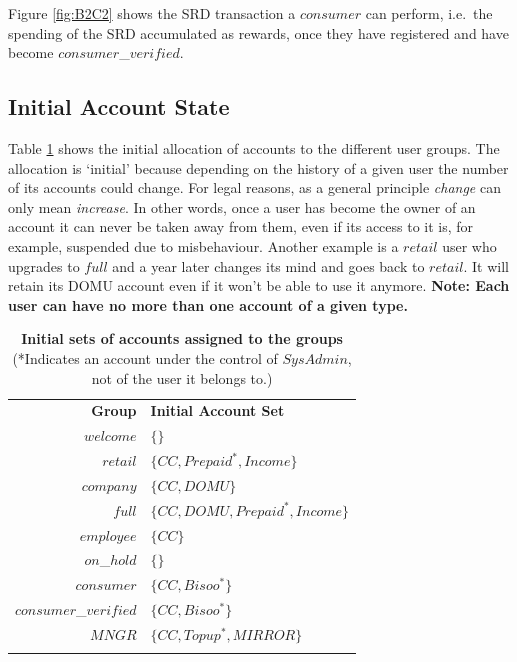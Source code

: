 Figure \ref{fig:B2C2} shows the SRD transaction a $consumer$ can perform, i.e.\ the spending of the SRD accumulated as rewards, once they have registered and have become $consumer$\_$verified$.

\subsection{Initial Account State}
Table \ref{tab:InitialAccountSets} shows the initial allocation of accounts to the different user groups. The allocation is `initial' because  depending on the history of a given user the number of its accounts could change. For legal reasons, as a general principle \emph{change} can only mean \emph{increase}. In other words, once a user has become the owner of an account it can never be taken away from them, even if its access to it is, for example, suspended due to misbehaviour. Another example is a $retail$ user who upgrades to $full$ and a year later changes its mind and goes back to $retail$. It will retain its DOMU account even if it won't be able to use it anymore. {\bf Note: Each user can have no more than one account of a given type.}

\begin{table}[h]
\begin{centering}
\small
{
\begin{tabular}{ r | l  }
\textbf{Group}	& {\bf Initial Account Set} \\
\Xhline{1.5pt}
$welcome$	& $\{ \}$ \\
\hline
$retail$		& $\{ CC, Prepaid^*, Income \}$ \\
\hline
$company$	& $\{ CC, DOMU \}$ \\
\hline
$full$		& $\{ CC, DOMU, Prepaid^*, Income \}$ \\
\hline
$employee$	& $\{ CC \}$ \\
\hline
$on$\_$hold$	& $\{  \}$ \\
\hline
$consumer$	& $\{ CC, Bisoo^* \}$ \\
\hline
$consumer$\_$verified$ & $\{ CC, Bisoo^* \}$ \\
\hline
$MNGR$ 		& $\{ CC, Topup^*, MIRROR \}$ \\
\Xhline{1.5pt}
\end{tabular}
}
\caption{\small\textbf{Initial sets of accounts assigned to the groups}\\ (*Indicates an account under the control of $SysAdmin$, not of the user it belongs to.)}
\label{tab:InitialAccountSets}
\end{centering}
\end{table}


